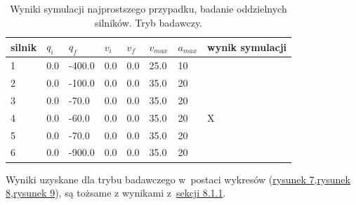 \documentclass[a4paper, 12pt]{article}
\begin{document}
	\begin{table}[H]
	\centering
	\begin{tabular}{|m{2.5em}|m{4em}|m{4em}|m{4em}|m{4em}|m{4em}|m{4em}|m{5em}|}
	\hline
	silnik&$ q_i $ & $ q_f $ & $ v_i $ & $ v_f $ & $ v_{max} $ & $ a_{max} $&wynik symulacji\\
	\hline
	\hline
	\hspace{1em}1& 0.0 & -400.0 & 0.0 & 0.0 & 25.0 & 10&\hspace{2em}\checkmark\\ %
	\hline
	\hspace{1em}2& 0.0 & -100.0 & 0.0 & 0.0 & 35.0 & 20&\hspace{2em}\checkmark\\ %
	\hline
	\hspace{1em}3& 0.0 & -70.0 & 0.0 & 0.0 & 35.0 & 20&\hspace{2em}\checkmark\\ %
	\hline
	\hspace{1em}4& 0.0 & -60.0 & 0.0 & 0.0 & 35.0 & 20&\hspace{2em}X\\  %
	\hline
	\hspace{1em}5& 0.0 & -70.0 & 0.0 & 0.0 & 35.0 & 20&\hspace{2em}\checkmark\\  %
	\hline
	\hspace{1em}6& 0.0 & -900.0 & 0.0 & 0.0 & 35.0 & 20&\hspace{2em}\checkmark\\  %
	\hline
	\end{tabular}
	\caption{Wyniki symulacji najprostszego przypadku, badanie oddzielnych silników. Tryb badawczy.}
	\label{tab:setup4}
	\end{table}
	Wyniki uzyskane dla trybu badawczego w~postaci wykresów (\hyperref[fig:simpMPVR]{rysunek 7},\hyperref[fig:simpMPVRrevers]{rysunek 8},\hyperref[fig:simpMPVRall]{rysunek 9}), są tożsame z wynikami z~\hyperref[sec:MPVR]{sekcji 8.1.1}.
	
\end{document}
